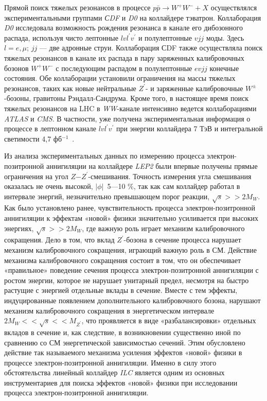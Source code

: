 Прямой поиск тяжелых резонансов в процессе $p\bar{p} \rightarrow W^+W^- + X$ осуществлялся экспериментальными группами \textit{СDF} и \textit{D0} на коллайдере тэватрон. Коллаборация \textit{D0} исследовала возможность рождения резонанса в канале его дибозонного распада, используя чисто лептонные $lvl^\prime v^\prime$ и полулептонные $vjj$ моды. Здесь $l=e,\mu$; $jj$ — две адронные струи. Коллаборация СDF также осуществляла поиск тяжелых резонансов в канале их распада в пару заряженных калибровочных бозонов $W^+W^−$ с последующим распадом в полулептонные $evjj$ конечные состояния. Обе коллаборации установили ограничения на массы тяжелых резонансов, таких как новые нейтральные $Z^\prime$- и заряженные калибровочные $W^±$-бозоны, гравитоны Рэндалл-Сандрума. Кроме того, в настоящее время поиск тяжелых резонансов на LHC в \textit{WW}-канале интенсивно ведется коллаборациями \textit{ATLAS} и \textit{CMS}. В частности, уже получена экспериментальная информация о процессе в лептонном канале $lvl^\prime v^\prime$ при энергии коллайдера 7 ТэВ и интегральной светимости 4,7 фб${}^{−1}$~\cite{Bobovnikov:2016}.

Из анализа экспериментальных данных по измерению процесса электрон-позитронной аннигиляции на коллайдере \textit{LEP2} были впервые получены прямые ограничения на угол $Z$−$Z^\prime$-смешивания. Точность измерения угла смешивания оказалась не очень высокой, $\left |\phi \right |$~5—10 \%, так как сам коллайдер работал в интервале энергий, незначительно превышающем порог реакции, $\sqrt{s} >> 2M_W$. Как было установлено ранее, чувствительность процесса электрон-позитронной аннигиляции к эффектам «новой» физики значительно усиливается при высоких энергиях, $\sqrt{s} >> 2M_W$, где важную роль играет механизм калибровочного сокращения. Дело в том, что вклад $Z^\prime$-бозона в сечение процесса нарушает механизм калибровочного сокращения, играющий важную роль в СМ. Действие механизма калибровочного сокращения состоит в том, что он обеспечивает «правильное» поведение сечения процесса электрон-позитронной аннигиляции с ростом энергии, которое не нарушает унитарный предел, несмотря на быстро растущие с энергией отдельные вклады в сечение. Вместе с тем эффекты, индуцированные появлением дополнительного калибровочного бозона, нарушают механизм калибровочного сокращения в энергетическом интервале $2M_W << \sqrt{s} << M_{Z^\prime}$, что проявляется в виде «разбалансировки» отдельных вкладов в сечение и, как следствие, в возникновении существенно иной по сравнению со СМ энергетической зависимостью сечений. Этим обусловлено действие так называемого механизма усиления эффектов «новой» физики в процессе электрон-позитронной аннигиляции. Именно в силу этого обстоятельства линейный коллайдер \textit{ILC} является одним из основных инструментариев для поиска эффектов «новой» физики при исследовании процесса электрон-позитронной аннигиляции.

